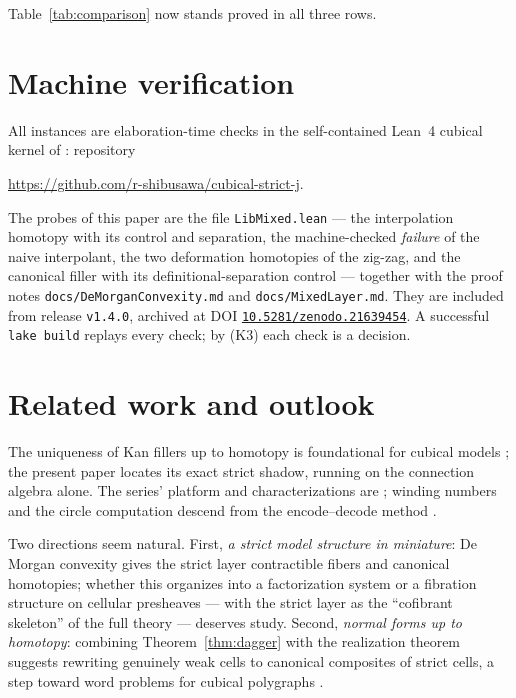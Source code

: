 \documentclass[11pt]{amsart}
\theoremstyle{definition}
\begin{document}
Table~\ref{tab:comparison} now stands proved in all three rows.

\section{Machine verification}
\label{sec:artifact}

All instances are elaboration-time checks in the self-contained
Lean~4 cubical kernel of \cite{Const}: repository
\begin{center}
  \url{https://github.com/r-shibusawa/cubical-strict-j}.
\end{center}
The probes of this paper are the file \texttt{LibMixed.lean} ---
the interpolation homotopy with its control and separation, the
machine-checked \emph{failure} of the naive interpolant, the two
deformation homotopies of the zig-zag, and the canonical filler
with its definitional-separation control --- together with the
proof notes \texttt{docs/DeMorganConvexity.md} and
\texttt{docs/MixedLayer.md}.  They are included from release
\texttt{v1.4.0}, archived at DOI
\href{https://doi.org/10.5281/zenodo.21639454}%
{\texttt{10.5281/zenodo.21639454}}.  A successful
\texttt{lake build} replays every check; by (K3) each check is a
decision.

\section{Related work and outlook}
\label{sec:related}

The uniqueness of Kan fillers up to homotopy is foundational for
cubical models \cite{CCHM}; the present paper locates its exact
strict shadow, running on the connection algebra alone.  The
series' platform and characterizations are
\cite{Const,Sphere,Realization}; winding numbers and the circle
computation descend from the encode--decode method
\cite{LicataShulman}.

Two directions seem natural.  First, \emph{a strict model
structure in miniature}: De Morgan convexity gives the strict
layer contractible fibers and canonical homotopies; whether this
organizes into a factorization system or a fibration structure on
cellular presheaves --- with the strict layer as the ``cofibrant
skeleton'' of the full theory --- deserves study.  Second,
\emph{normal forms up to homotopy}: combining
Theorem~\ref{thm:dagger} with the realization theorem suggests
rewriting genuinely weak cells to canonical composites of strict
cells, a step toward word problems for cubical polygraphs
\cite[\S 10]{Realization}.
\end{document}
